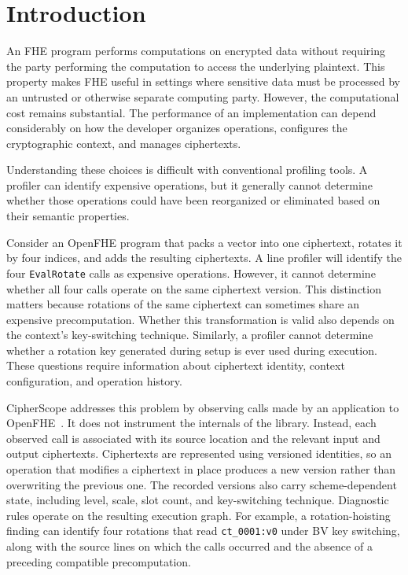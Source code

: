 \documentclass[sigconf,nonacm]{acmart}
\begin{document}
\maketitle

\section{Introduction}
\label{sec:intro}

An FHE program performs computations on encrypted data without requiring the
party performing the computation to access the underlying plaintext. This
property makes FHE useful in settings where sensitive data must be processed
by an untrusted or otherwise separate computing party. However, the
computational cost remains substantial. The performance of an implementation
can depend considerably on how the developer organizes operations, configures
the cryptographic context, and manages ciphertexts.

Understanding these choices is difficult with conventional profiling tools. A
profiler can identify expensive operations, but it generally cannot determine
whether those operations could have been reorganized or eliminated based on
their semantic properties.

Consider an OpenFHE program that packs a vector into one ciphertext, rotates
it by four indices, and adds the resulting ciphertexts. A line profiler will
identify the four \texttt{EvalRotate} calls as expensive operations. However,
it cannot determine whether all four calls operate on the same ciphertext
version. This distinction matters because rotations of the same ciphertext
can sometimes share an expensive precomputation. Whether this transformation
is valid also depends on the context's key-switching technique. Similarly, a
profiler cannot determine whether a rotation key generated during setup is
ever used during execution. These questions require information about
ciphertext identity, context configuration, and operation history.

CipherScope addresses this problem by observing calls made by an application
to OpenFHE~\cite{openfhe2022}. It does not instrument the internals of the
library. Instead, each observed call is associated with its source location
and the relevant input and output ciphertexts. Ciphertexts are represented
using versioned identities, so an operation that modifies a ciphertext in
place produces a new version rather than overwriting the previous one. The
recorded versions also carry scheme-dependent state, including level, scale,
slot count, and key-switching technique. Diagnostic rules operate on the
resulting execution graph. For example, a rotation-hoisting finding can
identify four rotations that read \texttt{ct\_0001:v0} under BV key
switching, along with the source lines on which the calls occurred and the
absence of a preceding compatible precomputation.
\end{document}
